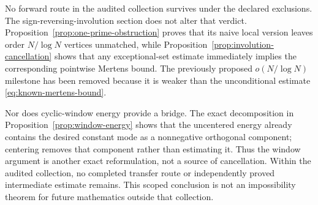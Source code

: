\documentclass[11pt]{amsart}
\numberwithin{equation}{section}
\theoremstyle{plain}
\theoremstyle{definition}
\theoremstyle{remark}
\begin{document}
No forward route in the audited collection survives under the declared
exclusions.  The sign-reversing-involution section
does not alter that verdict.  Proposition~\ref{prop:one-prime-obstruction}
proves that its naive local version leaves order \(N/\log N\) vertices
unmatched, while Proposition~\ref{prop:involution-cancellation} shows that any
exceptional-set estimate immediately implies the corresponding pointwise
Mertens bound.  The previously proposed \(o(N/\log N)\) milestone has been
removed because it is weaker than the unconditional estimate
\eqref{eq:known-mertens-bound}.

Nor does cyclic-window energy provide a bridge.  The exact decomposition in
Proposition~\ref{prop:window-energy} shows that the uncentered energy already
contains the desired constant mode as a nonnegative orthogonal component;
centering removes that component rather than estimating it.  Thus the
window argument is another exact reformulation, not a source of cancellation.
Within the audited collection, no completed transfer route or independently
proved intermediate estimate remains.  This scoped conclusion is not an
impossibility theorem for
future mathematics outside that collection.
\end{document}
